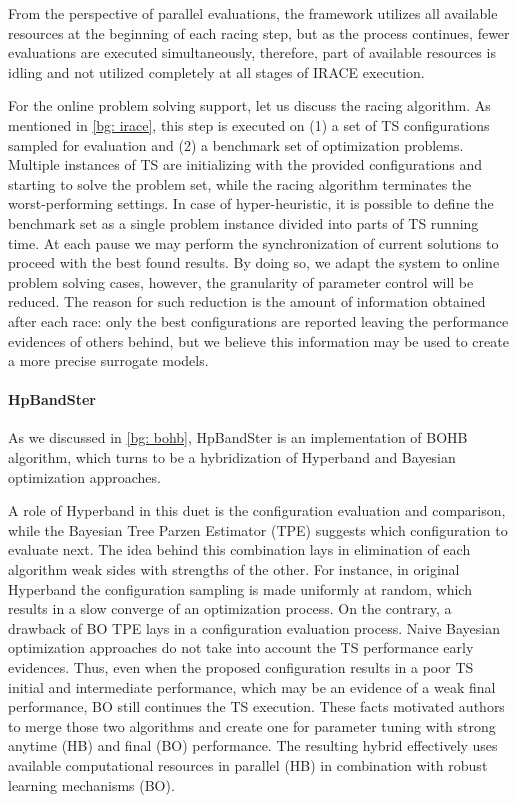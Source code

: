 From the perspective of parallel evaluations, the framework utilizes all available resources at the beginning of each racing step, but as the process continues, fewer evaluations are executed simultaneously, therefore, part of available resources is idling and not utilized completely at all stages of IRACE execution.

For the online problem solving support, let us discuss the racing algorithm. As mentioned in \cref{bg: irace}, this step is executed on (1) a set of TS configurations sampled for evaluation and (2) a benchmark set of optimization problems. Multiple instances of TS are initializing with the provided configurations and starting to solve the problem set, while the racing algorithm terminates the worst-performing settings. In case of hyper-heuristic, it is possible to define the benchmark set as a single problem instance divided into parts of TS running time. At each pause we may perform the synchronization of current solutions to proceed with the best found results. By doing so, we adapt the system to online problem solving cases, however, the granularity of parameter control will be reduced. The reason for such reduction is the amount of information obtained after each race: only the best configurations are reported leaving the performance evidences of others behind, but we believe this information may be used to create a more precise surrogate models.

\paragraph{HpBandSter} As we discussed in \cref{bg: bohb}, HpBandSter is an implementation of BOHB algorithm, which turns to be a hybridization of Hyperband and Bayesian optimization approaches.

A role of Hyperband in this duet is the configuration evaluation and comparison, while the Bayesian Tree Parzen Estimator (TPE) suggests which configuration to evaluate next. The idea behind this combination lays in elimination of each algorithm weak sides with strengths of the other. For instance, in original Hyperband the configuration sampling is made uniformly at random, which results in a slow converge of an optimization process. On the contrary, a drawback of BO TPE lays in a configuration evaluation process. Naive Bayesian optimization approaches do not take into account the TS performance early evidences. Thus, even when the proposed configuration results in a poor TS initial and intermediate performance, which may be an evidence of a weak final performance, BO still continues the TS execution. These facts motivated authors to merge those two algorithms and create one for parameter tuning with strong anytime (HB) and final (BO) performance. The resulting hybrid effectively uses available computational resources in parallel (HB) in combination with robust learning mechanisms (BO).

